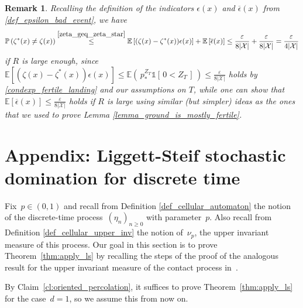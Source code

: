 \documentclass[a4paper,12pt]{article}
\newtheorem  {remark}        [theorem]{Remark}
\begin{document}
\begin{remark}
Recalling the definition of the indicators $\epsilon(x)$ and $\overline{\epsilon}(x)$ from \eqref{def_epsilon_bad_event}, we have
\begin{equation*}
\mathbb{P}\left( \zeta^*(x) \neq  \zeta(x) \right) \stackrel{ \eqref{zeta_geq_zeta_star} }{\leq} \mathbb{E}\left[ (\zeta(x)-\zeta^*(x))\epsilon(x)  \right] +
 \mathbb{E}\left[ \overline{\epsilon}(x)\right] \leq \frac{\varepsilon}{8|\mathcal{X}| } + \frac{\varepsilon}{8|\mathcal{X}| } = \frac{\varepsilon}{4|\mathcal{X}| }
\end{equation*}
if $R$ is large enough, since
 $\mathbb{E}\left[ (\zeta(x)-\zeta^*(x))\epsilon(x)  \right]\leq \mathbb{E}\left( \, p_*^{Z_T} \mathds{1}[ \, 0 < Z_T \, ] \, \right) \leq \frac{\varepsilon}{8|\mathcal{X}| } $ holds by \eqref{condexp_fertile_landing} and our assumptions on $T$, while one can show that $\mathbb{E}\left[ \overline{\epsilon}(x)\right] \leq \frac{\varepsilon}{8|\mathcal{X}| }$ holds
 if $R$ is large using similar (but simpler) ideas as the ones that we used to prove Lemma \ref{lemma_ground_is_mostly_fertile}.
\end{remark}























\section{Appendix: Liggett-Steif stochastic domination for discrete time}
\label{subsection_appendix}

Fix~$p \in (0,1)$ and recall from Definition \ref{def_cellular_automaton} the notion of the discrete-time process~$(\eta_n)_{n \geq 0}$ with parameter~$p$. Also recall from Definition \ref{def_cellular_upper_inv} the notion of~$\nu_p$, the upper invariant measure of this process. Our goal in this section is to prove Theorem~\ref{thm:apply_ls} by recalling the steps of the proof of the analogous result for the upper invariant measure of the contact process in~\cite{LS06}.

By Claim~\ref{cl:oriented_percolation}, it suffices to prove Theorem~\ref{thm:apply_ls} for the case~$d = 1$, so we assume this from now on.
\end{document}
